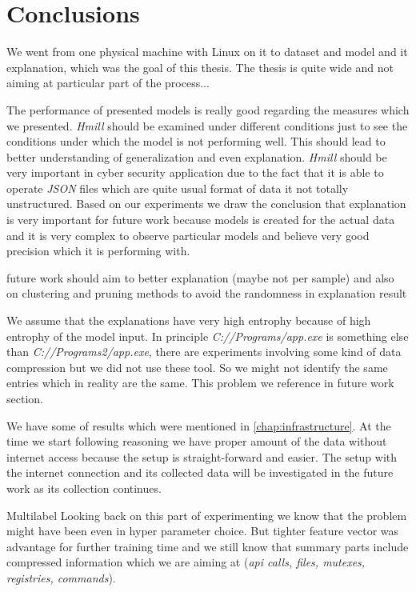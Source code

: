 \chapter{Conclusions} \label{chap:concl}
 We went from one physical machine with Linux on it to dataset and model and it explanation, which was the goal of this thesis. The thesis is quite wide and not aiming at particular part of the process...



The performance of presented models is really good regarding the measures which we presented. \emph{Hmill} should be examined under different conditions just to see the conditions under which the model is not performing well. This should lead to better understanding of generalization and even explanation. \emph{Hmill} should be very important in cyber security application due to the fact that it is able to operate \emph{JSON} files which are quite usual format of data it not totally unstructured. Based on our experiments we draw the conclusion that explanation is very important for future work because models is created for the actual data and it is very complex to observe particular models and believe very good precision which it is performing with.

future work should aim to better explanation (maybe not per sample) and also on clustering and pruning methods to avoid the randomness in explanation result


We assume that the explanations have very high entrophy because of high entrophy of the model input. In principle \emph{C://Programs/app.exe} is something else than \emph{C://Programs2/app.exe}, there are experiments involving some kind of data compression but we did not use these tool. So we might not identify the same entries which in reality are the same. This problem we reference in future work section.

We have some of results which were mentioned in \ref{chap:infrastructure}. At the time we start following reasoning we have proper amount of the data without internet access because the setup is straight-forward and easier. The setup with the internet connection and its collected data will be investigated in the future work as its collection continues. 


Multilabel
Looking back on this part of experimenting we know that the problem might have been even in hyper parameter choice. But tighter feature vector was advantage for further training time and we still know that summary parts include compressed information which we are aiming at (\emph{api calls, files, mutexes, registries, commands}).